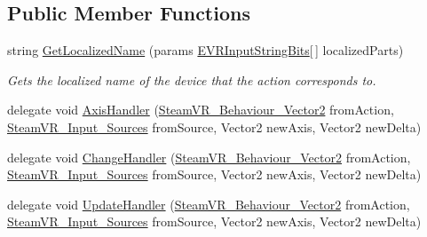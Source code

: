 \subsection*{Public Member Functions}
\begin{DoxyCompactItemize}
\item 
string \mbox{\hyperlink{class_valve_1_1_v_r_1_1_steam_v_r___behaviour___vector2_ab942ef39b26358192fee5466d7e99ab6}{Get\+Localized\+Name}} (params \mbox{\hyperlink{namespace_valve_1_1_v_r_a05e76187bbc5846b9bfb44f6acf13912}{E\+V\+R\+Input\+String\+Bits}}\mbox{[}$\,$\mbox{]} localized\+Parts)
\begin{DoxyCompactList}\small\item\em Gets the localized name of the device that the action corresponds to. \end{DoxyCompactList}\item 
delegate void \mbox{\hyperlink{class_valve_1_1_v_r_1_1_steam_v_r___behaviour___vector2_a8d32523a44d5d8f20a99caf00f35020d}{Axis\+Handler}} (\mbox{\hyperlink{class_valve_1_1_v_r_1_1_steam_v_r___behaviour___vector2}{Steam\+V\+R\+\_\+\+Behaviour\+\_\+\+Vector2}} from\+Action, \mbox{\hyperlink{namespace_valve_1_1_v_r_a82e5bf501cc3aa155444ee3f0662853f}{Steam\+V\+R\+\_\+\+Input\+\_\+\+Sources}} from\+Source, Vector2 new\+Axis, Vector2 new\+Delta)
\item 
delegate void \mbox{\hyperlink{class_valve_1_1_v_r_1_1_steam_v_r___behaviour___vector2_aae8467eb06531543c1ea5b6033b53495}{Change\+Handler}} (\mbox{\hyperlink{class_valve_1_1_v_r_1_1_steam_v_r___behaviour___vector2}{Steam\+V\+R\+\_\+\+Behaviour\+\_\+\+Vector2}} from\+Action, \mbox{\hyperlink{namespace_valve_1_1_v_r_a82e5bf501cc3aa155444ee3f0662853f}{Steam\+V\+R\+\_\+\+Input\+\_\+\+Sources}} from\+Source, Vector2 new\+Axis, Vector2 new\+Delta)
\item 
delegate void \mbox{\hyperlink{class_valve_1_1_v_r_1_1_steam_v_r___behaviour___vector2_a234f522c6df42a17b1f11cf8e9556ada}{Update\+Handler}} (\mbox{\hyperlink{class_valve_1_1_v_r_1_1_steam_v_r___behaviour___vector2}{Steam\+V\+R\+\_\+\+Behaviour\+\_\+\+Vector2}} from\+Action, \mbox{\hyperlink{namespace_valve_1_1_v_r_a82e5bf501cc3aa155444ee3f0662853f}{Steam\+V\+R\+\_\+\+Input\+\_\+\+Sources}} from\+Source, Vector2 new\+Axis, Vector2 new\+Delta)
\end{DoxyCompactItemize}
